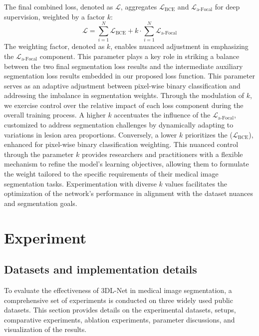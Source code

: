 \documentclass[review]{elsarticle}
\begin{document}
	The final combined loss, denoted as \(\mathcal{L}\), aggregates \(\mathcal{L}_\text{BCE}\) and \(\mathcal{L}_\text{a-Focal}\) for deep supervision, weighted by a factor \(k\):
	\begin{equation}
		\mathcal{L} = \sum_{i=1}^{N} \mathcal{L}_\text{BCE} + k \cdot \sum_{i=1}^{N} \mathcal{L}_\text{a-Focal}
	\end{equation}
	The weighting factor, denoted as $ k $, enables nuanced adjustment in emphasizing the \(\mathcal{L}_\text{a-Focal}\) component. This parameter plays a key role in striking a balance between the two final segmentation loss results and the intermediate auxiliary segmentation loss results embedded in our proposed loss function. This parameter serves as an adaptive adjustment between pixel-wise binary classification and addressing the imbalance in segmentation weights. Through the modulation of $ k $, we exercise control over the relative impact of each loss component during the overall training process. A higher $ k $ accentuates the influence of the \(\mathcal{L}_\text{a-Focal}\), customized to address segmentation challenges by dynamically adapting to variations in lesion area proportions. Conversely, a lower $ k $ prioritizes the (\(\mathcal{L}_\text{BCE}\)), enhanced for pixel-wise binary classification weighting. This nuanced control through the parameter $ k $ provides researchers and practitioners with a flexible mechanism to refine the model's learning objectives, allowing them to formulate the weight tailored to the specific requirements of their medical image segmentation tasks. Experimentation with diverse $ k $ values facilitates the optimization of the network's performance in alignment with the dataset nuances and segmentation goals.
	
	\section{Experiment}
	\label{section:experiment}
	\subsection{Datasets and implementation details}
	To evaluate the effectiveness of 3DL-Net in medical image segmentation, a comprehensive set of experiments is conducted on three widely used public datasets. This section provides details on the experimental datasets, setups, comparative experiments, ablation experiments, parameter discussions, and visualization of the results. 
\end{document}
